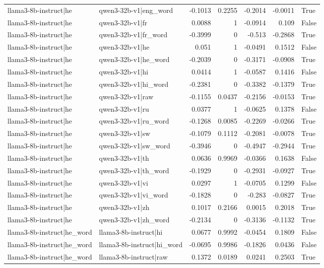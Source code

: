 \begin{table}
\begin{tabular}{l l r r r r l}
llama3-8b-instruct|he & qwen3-32b-v1|eng_word & -0.1013 & 0.2255 & -0.2014 & -0.0011 & True \\
llama3-8b-instruct|he & qwen3-32b-v1|fr & 0.0088 & 1 & -0.0914 & 0.109 & False \\
llama3-8b-instruct|he & qwen3-32b-v1|fr_word & -0.3999 & 0 & -0.513 & -0.2868 & True \\
llama3-8b-instruct|he & qwen3-32b-v1|he & 0.051 & 1 & -0.0491 & 0.1512 & False \\
llama3-8b-instruct|he & qwen3-32b-v1|he_word & -0.2039 & 0 & -0.3171 & -0.0908 & True \\
llama3-8b-instruct|he & qwen3-32b-v1|hi & 0.0414 & 1 & -0.0587 & 0.1416 & False \\
llama3-8b-instruct|he & qwen3-32b-v1|hi_word & -0.2381 & 0 & -0.3382 & -0.1379 & True \\
llama3-8b-instruct|he & qwen3-32b-v1|raw & -0.1155 & 0.0437 & -0.2156 & -0.0153 & True \\
llama3-8b-instruct|he & qwen3-32b-v1|ru & 0.0377 & 1 & -0.0625 & 0.1378 & False \\
llama3-8b-instruct|he & qwen3-32b-v1|ru_word & -0.1268 & 0.0085 & -0.2269 & -0.0266 & True \\
llama3-8b-instruct|he & qwen3-32b-v1|sw & -0.1079 & 0.1112 & -0.2081 & -0.0078 & True \\
llama3-8b-instruct|he & qwen3-32b-v1|sw_word & -0.3946 & 0 & -0.4947 & -0.2944 & True \\
llama3-8b-instruct|he & qwen3-32b-v1|th & 0.0636 & 0.9969 & -0.0366 & 0.1638 & False \\
llama3-8b-instruct|he & qwen3-32b-v1|th_word & -0.1929 & 0 & -0.2931 & -0.0927 & True \\
llama3-8b-instruct|he & qwen3-32b-v1|vi & 0.0297 & 1 & -0.0705 & 0.1299 & False \\
llama3-8b-instruct|he & qwen3-32b-v1|vi_word & -0.1828 & 0 & -0.283 & -0.0827 & True \\
llama3-8b-instruct|he & qwen3-32b-v1|zh & 0.1017 & 0.2166 & 0.0015 & 0.2018 & True \\
llama3-8b-instruct|he & qwen3-32b-v1|zh_word & -0.2134 & 0 & -0.3136 & -0.1132 & True \\
llama3-8b-instruct|he_word & llama3-8b-instruct|hi & 0.0677 & 0.9992 & -0.0454 & 0.1809 & False \\
llama3-8b-instruct|he_word & llama3-8b-instruct|hi_word & -0.0695 & 0.9986 & -0.1826 & 0.0436 & False \\
llama3-8b-instruct|he_word & llama3-8b-instruct|raw & 0.1372 & 0.0189 & 0.0241 & 0.2503 & True \\

\end{tabular}
\end{table}
